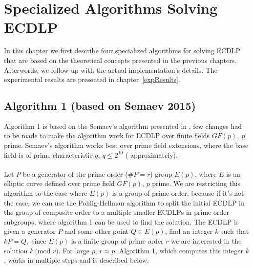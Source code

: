 \documentclass[thesis=M,english]{FITthesis}[2012/10/20]
\theoremstyle{remark}
\theoremstyle{definition}
\begin{document}
\chapter{Specialized Algorithms Solving ECDLP}
\label{specAlg}
In this chapter we first describe four specialized algorithms for solving ECDLP that are based on the theoretical concepts presented in the previous chapters. Afterwords, we follow up with the actual implementation's details. The experimental results are presented in chapter~\ref{expResults}.
\section{Algorithm 1 (based on Semaev 2015)}
Algorithm 1 is based on the Semaev's algorithm presented in \cite{semaev15}, few changes had to be made to make the algorithm work for ECDLP over finite fields $GF(p),\ p$ prime. Semaev's algorithm works best over prime field extensions, where the base field is of prime characteristic $q,\ q \leq 2^{10}$ ( approximately).  \\ \\
\noindent Let $P$ be a generator of the prime order ($\#P = r$) group $E(p)$, where $E$ is an elliptic curve defined over prime field $GF(p)$, $p$ prime. We are restricting this algorithm to the case where $E(p)$ is a group of prime order, because if it's not the case, we can use the Pohlig-Hellman algorithm to split the initial ECDLP in the group of composite order to a multiple smaller ECDLPs in prime order subgroups, where algorithm 1 can be used to find the solution. The ECDLP is given a generator $P$ and some other point $Q \in E(p)$, find an integer $k$ such that $kP = Q,$ since $E(p)$ is a finite group of prime order $r$ we are interested in the solution $k\ \text{(mod }r)$. For large $p$, $r \approx p$. Algorithm 1, which computes this integer $k$, works in multiple steps and is described below.
\end{document}
